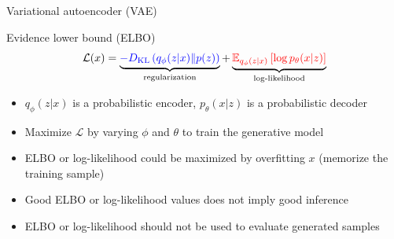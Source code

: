 \documentclass [aspectratio=169]{beamer}
\begin{document}
\begin{frame}{Variational autoencoder (VAE)}
    \begin{block}{Evidence lower bound (ELBO)}
        \begin{equation*}
            \mathcal{L}(x)=\underbrace{\color{blue}-D_{\mathrm{KL}}\left(q_{\phi}(z | x) \| p(z)\right) }_{\text{regularization}}+ \underbrace{\color{red}\mathbb{E}_{q_{\phi}(z | x)}\left[\log p_{\theta}(x | z)\right]}_{\text{log-likelihood}}
        \end{equation*}
	\end{block}
	\begin{itemize}
        \item $q_{\phi}(z | x)$ is a probabilistic encoder, $p_{\theta}(x | z)$ is a probabilistic decoder
        \item Maximize $\mathcal{L}$ by varying $\phi$ and $\theta$ to train the generative model
        \item ELBO or log-likelihood could be maximized by overfitting $x$ (memorize the training sample)
        \item Good ELBO or log-likelihood values does not imply good inference
        \item ELBO or log-likelihood should not be used to evaluate generated samples
    \end{itemize}
\end{frame}
\end{document}
